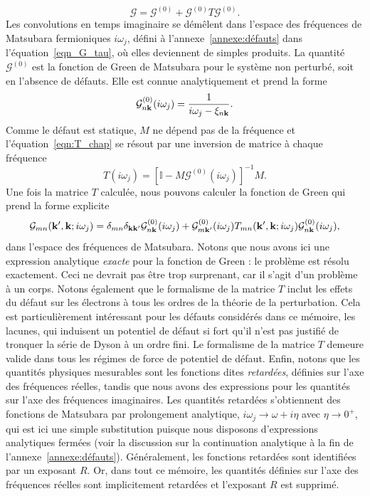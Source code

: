 \begin{equation}
    \mathcal{G} = \mathcal{G}^{(0)}+\mathcal{G}^{(0)}T\mathcal{G}^{(0)}.\label{eqn:G_chap}
\end{equation}
Les convolutions en temps imaginaire se démêlent dans l'espace des fréquences de Matsubara fermioniques $i\omega_j$, défini à l'annexe~\ref{annexe:défauts} dans l'équation~\eqref{eqn_G_tau}, où elles deviennent de simples produits. La quantité $\mathcal{G}^{(0)}$ est la fonction de Green de Matsubara pour le système non perturbé, soit en l'absence de défauts. Elle est connue analytiquement et prend la forme
\begin{equation}
    \mathcal{G}^{(0)}_{n\mathbf{k}}(i\omega_j) = \frac{1}{i\omega_j-\xi_{n\mathbf{k}}}.
\end{equation}
Comme le défaut est statique, $M$ ne dépend pas de la fréquence et l'équation~\eqref{eqn:T_chap} se résout par une inversion de matrice à chaque fréquence
\begin{equation}
    T(i\omega_j) = \left[\mathbb{I}-M\mathcal{G}^{(0)}(i\omega_j)\right]^{-1}M.
\end{equation}
Une fois la matrice $T$ calculée, nous pouvons calculer la fonction de Green qui prend la forme explicite
\begin{equation}
    \mathcal{G}_{mn}(\mathbf{k}',\mathbf{k};i\omega_j) =\delta_{mn}\delta_{\mathbf{k}\mathbf{k}'}\mathcal{G}^{(0)}_{n\mathbf{k}}(i\omega_j)+\mathcal{G}_{m\mathbf{k}'}^{(0)}(i\omega_j)T_{mn}(\mathbf{k}',\mathbf{k}; i\omega_j)\mathcal{G}_{n\mathbf{k}}^{(0)}(i\omega_j),
\end{equation}
dans l'espace des fréquences de Matsubara. Notons que nous avons ici une expression analytique \textit{exacte} pour la fonction de Green : le problème est résolu exactement. Ceci ne devrait pas être trop surprenant, car il s'agit d'un problème à un corps. Notons également que le formalisme de la matrice $T$ inclut les effets du défaut sur les électrons à tous les ordres de la théorie de la perturbation. Cela est particulièrement intéressant pour les défauts considérés dans ce mémoire, les lacunes, qui induisent un potentiel de défaut si fort qu'il n'est pas justifié de tronquer la série de Dyson à un ordre fini. Le formalisme de la matrice $T$ demeure valide dans tous les régimes de force de potentiel de défaut.
Enfin, notons que les quantités physiques mesurables sont les fonctions dites \textit{retardées}, définies
sur l'axe des fréquences réelles, tandis que nous avons des expressions pour les quantités sur l'axe des fréquences imaginaires. Les quantités retardées s'obtiennent des fonctions de Matsubara par prolongement analytique, $i\omega_j \to \omega + i\eta$ avec $\eta \to 0^+$, qui est ici une simple substitution puisque nous disposons d'expressions analytiques fermées (voir la discussion sur la continuation analytique à la fin de l'annexe~\ref{annexe:défauts}). Généralement, les fonctions retardées sont identifiées par un exposant $R$. Or, dans tout ce mémoire, les quantités définies sur l'axe des fréquences réelles sont implicitement retardées et l'exposant $R$ est supprimé.

